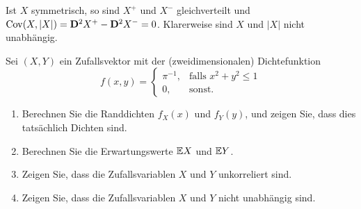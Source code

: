 \solution Ist $X$ symmetrisch, so sind $X^{+}$ und $X^{-}$
gleichverteilt und $\operatorname{Cov}(X, |X|) = \mathbf D^2 X^{+} - \mathbf D^{2} X^{-}
= 0$. Klarerweise sind $X$ und $|X|$ nicht unabhängig. 

 Sei $(X,Y)$
ein Zufallsvektor mit der (zweidimensionalen) Dichtefunktion 
\begin{equation*}
    f(x,y) = \begin{cases}
        \pi^{-1}, & \text{falls } x^{2}+y^{2} \leq 1 \\
        0,& \text{sonst.}
    \end{cases}
\end{equation*}
\begin{enumerate}
    \item Berechnen Sie die Randdichten $f_{X}(x)$ und $f_{Y}(y)$, und zeigen
        Sie, dass dies tatsächlich Dichten sind.
        
    \item Berechnen Sie die Erwartungswerte $\mathbb{E} X$ und $\mathbb{E} Y$.

    \item Zeigen Sie, dass die Zufallsvariablen $X$ und $Y$ unkorreliert sind.
    \item Zeigen Sie, dass die Zufallsvariablen $X$ und $Y$ nicht unabhängig sind. 
\end{enumerate}

